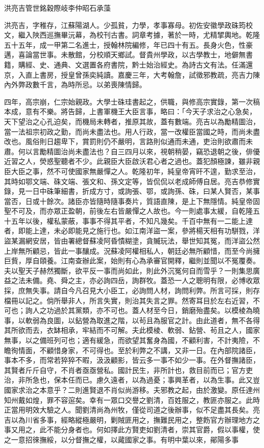 
\begin{pinyinscope}
洪亮吉管世銘穀際岐李仲昭石承藻

洪亮吉，字稚存，江蘇陽湖人。少孤貧，力學，孝事寡母。初佐安徽學政硃筠校文，繼入陜西巡撫畢沅幕，為校刊古書。詞章考據，著於一時，尤精揅輿地。乾隆五十五年，成一甲第二名進士，授翰林院編修，年已四十有五。長身火色，性豪邁，喜論當世事。未散館，分校順天鄉試。督貴州學政，以古學教士，地僻無書籍，購經、史、通典、文選置各府書院，黔士始治經史。為詩古文有法。任滿還京，入直上書房，授皇曾孫奕純讀。嘉慶三年，大考翰詹，試徵邪教疏，亮吉力陳內外弊政數千言，為時所忌。以弟喪陳情歸。

四年，高宗崩，仁宗始親政。大學士硃珪書起之，供職，與修高宗實錄，第一次稿本成，意有不樂。將告歸，上書軍機王大臣言事，略曰：「今天子求治之心急矣，天下望治之心孔迫矣，而機局未轉者，推原其故，蓋有數端。亮吉以為勵精圖治，當一法祖宗初政之勤，而尚未盡法也。用人行政，當一改權臣當國之時，而尚未盡改也。風俗則日趨卑下，賞罰則仍不嚴明，言路則似通而未通，吏治則欲肅而未肅。何以言勵精圖治尚未盡法也？自三四月以來，視朝稍晏，竊恐退朝之後，俳優近習之人，熒惑聖聽者不少。此親臣大臣啟沃君心者之過也。蓋犯顏極諫，雖非親臣大臣之事，然不可使國家無嚴憚之人。乾隆初年，純皇帝宵旰不遑，勤求至治，其時如鄂文端、硃文端、張文和、孫文定等，皆侃侃以老成師傅自居。亮吉恭修實錄，見一日中硃筆細書，折成方寸，或詢張、鄂，或詢孫、硃，曰某人賢否，某事當否，日或十餘次。諸臣亦皆隨時隨事奏片，質語直陳，是上下無隱情。純皇帝固聖不可及，而亦眾正盈朝，前後左右皆嚴憚之人故也。今一則處事太緩，自乾隆五十五年以後，權私蒙蔽，事事不得其平者，不知凡幾矣。千百中無有一二能上達者，即能上達，未必即能見之施行也。如江南洋盜一案，參將楊天相有功駢戮，洋盜某漏網安居，皆由署總督蘇凌阿昏憒糊塗，貪贓玩法，舉世知其冤，而洋盜公然上岸無所顧忌，皆此一事釀成。況蘇凌阿權相私人，朝廷必無所顧惜，而至今尚擁巨貲，厚自頤養。江南查辦此案，始則有心為承審官開釋，繼則並聞以不冤覆奏。夫以聖天子赫然獨斷，欲平反一事而尚如此，則此外沉冤何自而雪乎？一則集思廣益之法未備。堯、舜之主，亦必詢四岳，詢群牧。蓋恐一人之聰明有限，必博收眾採，庶無失事。請自今凡召見大小臣工，必詢問人材，詢問利弊。所言可採，則存檔冊以記之。倘所舉非人，所言失實，則治其失言之罪。然寄耳目於左右近習，不可也；詢人之功過於其黨類，亦不可也。蓋人材至今日，銷磨殆盡矣。以模棱為曉事，以軟弱為良圖，以鉆營為取進之階，以茍且為服官之計。由此道者，無不各得其所欲而去，衣缽相承，牢結而不可解。夫此模棱、軟弱、鉆營、茍且之人，國家無事，以之備班列可也；適有緩急，而欲望其奮身為國，不顧利害，不計夷險，不瞻徇情面，不顧惜身家，不可得也。至於利弊之不講，又非一日。在內部院諸臣，事本不多，而常若猝猝不暇，汲汲顧影，皆云多一事不如少一事。在外督撫諸臣，其賢者斤斤自守，不肖者亟亟營私。國計民生，非所計也，救目前而已；官方吏治，非所急也，保本任而已。慮久遠者，以為過憂；事興革者，以為生事。此又豈國家求治之本意乎？二則進賢退不肖似尚游移。夫邪教之起，由於激變。原任達州知州戴如煌，罪不容逭矣。幸有一眾口交譽之劉清，百姓服之，教匪亦服之。此時正當用明效大驗之人。聞劉清尚為州牧，僅從司道之後辦事，似不足盡其長矣。亮吉以為川省多事，經略縱極嚴明，剿賊匪用之，撫難民用之，整飭官方辦理地方之事又用之，此不能分身者也。何如擇此方賢吏如劉清者，崇其官爵，假以事權，使之一意招徠撫綏，以分督撫之權，以蕆國家之事。有明中葉以來，鄖陽多事
\end{pinyinscope}
